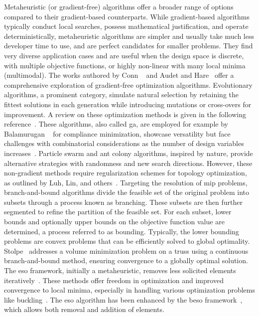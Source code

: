Metaheuristic (or gradient-free) algorithms offer a broader range of options compared to their gradient-based counterparts. While gradient-based algorithms typically conduct local searches, possess mathematical justification, and operate deterministically, metaheuristic algorithms are simpler and usually take much less developer time to use, and are perfect candidates for smaller problems. They find very diverse application cases and are useful when the design space is discrete, with multiple objective functions, or highly non-linear with many local minima (multimodal). The works authored by Conn \etal~ and Audet and Hare~ offer a comprehensive exploration of gradient-free optimization algorithms. Evolutionary algorithms, a prominent category, simulate natural selection by retaining the fittest solutions in each generation while introducing mutations or cross-overs for improvement. A review on these optimization methods is given in the following reference~. These algorithms, also called \gls{ga}, are employed for example by Balamurugan \etal~ for compliance minimization, showcase versatility but face challenges with combinatorial considerations as the number of design variables increases~. Particle swarm and ant colony algorithms, inspired by nature, provide alternative strategies with randomness and new search directions. However, these non-gradient methods require regularization schemes for topology optimization, as outlined by Luh, Lin, and others~.
Targeting the resolution of \gls{mip} problems, branch-and-bound algorithms divide the feasible set of the original problem into subsets through a process known as branching. These subsets are then further segmented to refine the partition of the feasible set. For each subset, lower bounds and optionally upper bounds on the objective function value are determined, a process referred to as bounding. Typically, the lower bounding problems are convex problems that can be efficiently solved to global optimality. Stolpe~ addresses a volume minimization problem on a truss using a continuous branch-and-bound method, ensuring convergence to a globally optimal solution. The \gls{eso} framework, initially a metaheuristic, removes less solicited elements iteratively~. These methods offer freedom in optimization and improved convergence to local minima, especially in handling various optimization problems like buckling~. The \gls{eso} algorithm has been enhanced by the \gls{beso} framework~, which allows both removal and addition of elements. 

